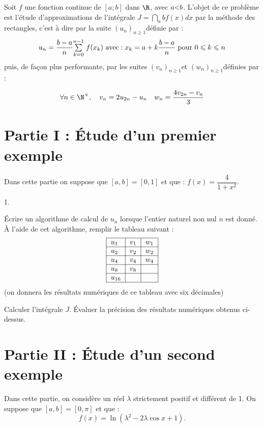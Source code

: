 \documentclass[11pt]{article}%
\begin{document}
\noindent Soit $f$ une fonction continue de $[a;b]$ dans $\R$, avec
$a{\large <}b$. L'objet de ce problème est l'étude d'approximations de
l'intégrale $J = \dint\limits_{a}{b}f(x)dx$ par la méthode des
rectangles, c'est à
dire par la suite $(u_{n})_{n\geq 1}$définie par :
\[
u_{n} = \dfrac{b-a}{n}{\textstyle\sum\limits_{k = 0}^{n-1}}\hspace{.1cm}f(x_{k})\text{ avec} :x_{k} = a +
k\dfrac{b-a}{n}\text{ pour }0\leqslant k\leqslant n
\]
puis, de façon plus performante, par les suites $(v_{n})_{n\geq 1}$et
$(w_{n})_{n\geq 1}$définies par :

\[
\forall n\in \N^{\times },\quad v_{n} = 2u_{2n}-u_{n}\quad w_{n} =
\dfrac{4v_{2n}-v_{n}}{3}
\]

\section*{Partie I : Étude d'un premier exemple}

Dans cette partie on suppose que $[a,b] = [0,1]$ et que : $f(x) =
\dfrac{4}{1 + x^{2}}$.

\begin{noliste}{1.}
 \setlength{\itemsep}{4mm}
\item Écrire un algorithme de calcul de $u_{n}$ lorsque l'entier
naturel non
nul $n$ est donné. À l'aide de cet algorithme, remplir le tableau
suivant : 
\[
\begin{tabular}{|l|l|l|}
\hline
$u_{1}$ & $v_{1}$ & $w_{1}$ \\
\hline
$u_{2}$ & $v_{2}$ & $w_{2}$ \\
\hline
$u_{4}$ & $v_{4}$ & $w_{4}$ \\
\hline
$u_{8}$ & $v_{8}$ & \\
\hline
$u_{16}$ & & \\
\hline
\end{tabular}
\]
(on donnera les résultats numériques de ce tableau avec six décimales)

\item Calculer l'intégrale $J$. Évaluer la précision des résultats
numériques obtenus ci-dessus.
\end{noliste}

\section*{Partie II : Étude d'un second exemple}

Dans cette partie, on considère un réel $\lambda $ strictement positif
et
différent de 1. On suppose que $[a,b] = [0,\pi ]$ et que :
\[
f(x) = \ln (\lambda ^{2}-2\lambda \cos x + 1).
\]
\end{document}
